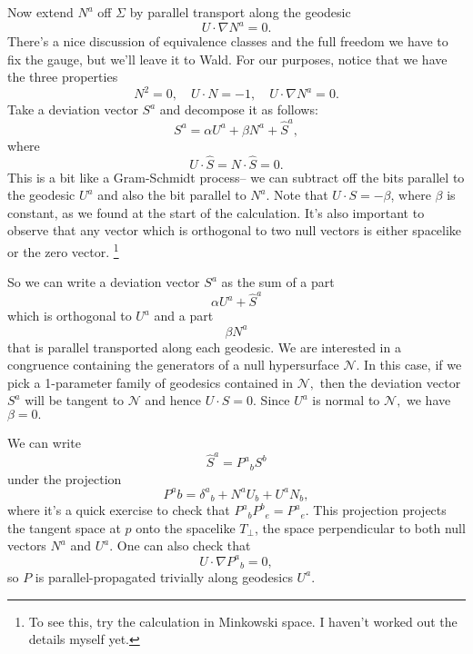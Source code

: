 Now extend $N^a$ off $\Sigma$ by parallel transport along the geodesic
\begin{equation}
    U\cdot \nabla N^a=0.
\end{equation}
There's a nice discussion of equivalence classes and the full freedom we have to fix the gauge, but we'll leave it to Wald. For our purposes, notice that we have the three properties
\begin{equation}
    N^2 = 0, \quad U\cdot N=-1,\quad U\cdot \nabla N^a=0.
\end{equation}
Take a deviation vector $S^a$ and decompose it as follows:
\begin{equation}
    S^a= \alpha U^a +\beta N^a + \hat S^a,
\end{equation}
where
\begin{equation}
    U\cdot \hat S = N\cdot \hat S=0.
\end{equation}
This is a bit like a Gram-Schmidt process-- we can subtract off the bits parallel to the geodesic $U^a$ and also the bit parallel to $N^a$.
Note that $U\cdot S=-\beta$, where $\beta$ is constant, as we found at the start of the calculation. It's also important to observe that any vector which is orthogonal to two null vectors is either spacelike or the zero vector.%
    \footnote{To see this, try the calculation in Minkowski space. I haven't worked out the details myself yet.}

So we can write a deviation vector $S^a$ as the sum of a part
\begin{equation*}
    \alpha U^a + \hat S^a
\end{equation*}
which is orthogonal to $U^a$ and a part
\begin{equation*}
    \beta N^a
\end{equation*}
that is parallel transported along each geodesic.
We are interested in a congruence containing the generators of a null hypersurface $\mathcal{N}$. In this case, if we pick a 1-parameter family of geodesics contained in $\mathcal{N},$ then the deviation vector $S^a$ will be tangent to $\mathcal{N}$ and hence $U\cdot S=0$. Since $U^a$ is normal to $\mathcal{N},$ we have $\beta=0.$

We can write
\begin{equation}
    \hat S^a = P^a{}_b S^b
\end{equation}
under the projection
\begin{equation}
    P^a{}b = \delta^a{}_b + N^a U_b + U^a N_b,
\end{equation}
where it's a quick exercise to check that $P^a{}_b P^b{}_e = P^a{}_e.$ This projection projects the tangent space at $p$ onto the spacelike $T_\perp$, the space perpendicular to both null vectors $N^a$ and $U^a$.
One can also check that
\begin{equation}
    U\cdot \nabla P^a{}_b =0,
\end{equation}
so $P$ is parallel-propagated trivially along geodesics $U^a$.

